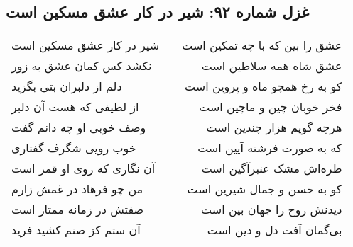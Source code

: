 \begin{center}
\section*{غزل شماره ۹۲: شیر در کار عشق مسکین است}
\label{sec:092}
\begin{longtable}{l p{0.5cm} r}
شیر در کار عشق مسکین است
&&
عشق را بین که با چه تمکین است
\\
نکشد کس کمان عشق به زور
&&
عشق شاه همه سلاطین است
\\
دلم از دلبران بتی بگزید
&&
کو به رخ همچو ماه و پروین است
\\
از لطیفی که هست آن دلبر
&&
فخر خوبان چین و ماچین است
\\
وصف خوبی او چه دانم گفت
&&
هرچه گویم هزار چندین است
\\
خوب رویی شگرف گفتاری
&&
که به صورت فرشته آیین است
\\
آن نگاری که روی او قمر است
&&
طره‌اش مشک عنبرآگین است
\\
من چو فرهاد در غمش زارم
&&
کو به حسن و جمال شیرین است
\\
صفتش در زمانه ممتاز است
&&
دیدنش روح را جهان بین است
\\
آن ستم کز صنم کشید فرید
&&
بی‌گمان آفت دل و دین است
\\
\end{longtable}
\end{center}
